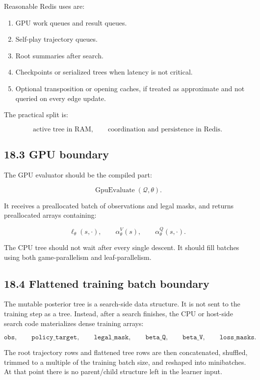 \documentclass[11pt]{article}
\newcommand{\GpuEvaluate}{\operatorname{GpuEvaluate}}
\begin{document}
Reasonable Redis uses are:

\begin{enumerate}[leftmargin=2em]
  \item GPU work queues and result queues.
  \item Self-play trajectory queues.
  \item Root summaries after search.
  \item Checkpoints or serialized trees when latency is not critical.
  \item Optional transposition or opening caches, if treated as approximate and
  not queried on every edge update.
\end{enumerate}

The practical split is:

\[
\text{active tree in RAM},
\qquad
\text{coordination and persistence in Redis}.
\]

\subsection*{18.3 GPU boundary}

The GPU evaluator should be the compiled part:

\[
\GpuEvaluate(\mathcal{Q},\theta).
\]

It receives a preallocated batch of observations and legal masks, and returns
preallocated arrays containing:

\[
\ell_\theta(s,\cdot),
\qquad
\alpha_\theta^V(s),
\qquad
\alpha_\theta^Q(s,\cdot).
\]

The CPU tree should not wait after every single descent. It should fill batches
using both game-parallelism and leaf-parallelism.

\subsection*{18.4 Flattened training batch boundary}

The mutable posterior tree is a search-side data structure. It is not sent to the
training step as a tree. Instead, after a search finishes, the CPU or host-side
search code materializes dense training arrays:

\[
\texttt{obs},
\qquad
\texttt{policy\_target},
\qquad
\texttt{legal\_mask},
\qquad
\texttt{beta\_Q},
\qquad
\texttt{beta\_V},
\qquad
\texttt{loss\_masks}.
\]

The root trajectory rows and flattened tree rows are then concatenated, shuffled,
trimmed to a multiple of the training batch size, and reshaped into minibatches.
At that point there is no parent/child structure left in the learner input.
\end{document}
